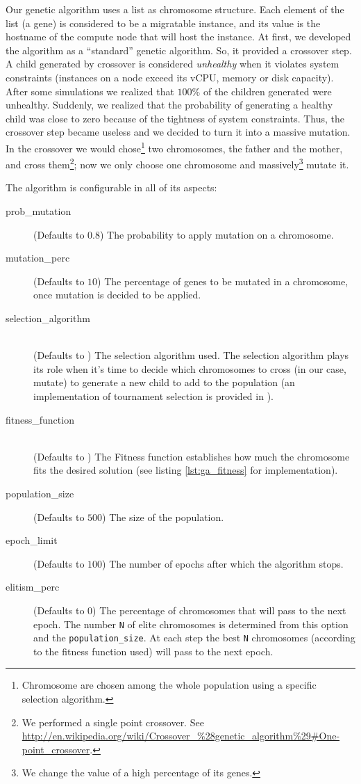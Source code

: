 Our genetic algorithm uses a list as chromosome structure. Each element of the list (a gene) is considered to be a migratable instance, and its value is the hostname of the compute node that will host the instance. At first, we developed the algorithm as a ``standard'' genetic algorithm. So, it provided a crossover step. A child generated by crossover is considered \emph{unhealthy} when it violates system constraints (instances on a node exceed its vCPU, memory or disk capacity). After some simulations we realized that $100\%$ of the children generated were unhealthy. Suddenly, we realized that the probability of generating a healthy child was close to zero because of the tightness of system constraints. Thus, the crossover step became useless and we decided to turn it into a massive mutation. In the crossover we would chose\footnote{Chromosome are chosen among the whole population using a specific selection algorithm.} two chromosomes, the father and the mother, and cross them\footnote{We performed a single point crossover. See \url{http://en.wikipedia.org/wiki/Crossover\_\%28genetic\_algorithm\%29\#One-point\_crossover}.}; now we only choose one chromosome and massively\footnote{We change the value of a high percentage of its genes.} mutate it.

The algorithm is configurable in all of its aspects:
\begin{description}
	\item[prob\_mutation] (Defaults to $0.8$) The probability to apply mutation on a chromosome.
	\item[mutation\_perc] (Defaults to $10$) The percentage of genes to be mutated in a chromosome, once mutation is decided to be applied.
	\item[selection\_algorithm] \hfill \\
	(Defaults to ) The selection algorithm used. The selection algorithm plays its role when it's time to decide which chromosomes to cross (in our case, mutate) to generate a new child to add to the population (an implementation of tournament selection is provided in ).
	\item[fitness\_function] \hfill \\
	(Defaults to ) The Fitness function establishes how much the chromosome fits the desired solution (see listing \ref{lst:ga_fitness} for  implementation).
	\item[population\_size] (Defaults to $500$) The size of the population.
	\item[epoch\_limit] (Defaults to $100$) The number of epochs after which the algorithm stops.
	\item[elitism\_perc] (Defaults to $0$) The percentage of chromosomes that will pass to the next epoch. The number \texttt{N} of elite chromosomes is determined from this option and the \texttt{population\_size}. At each step the best \texttt{N} chromosomes (according to the fitness function used) will pass to the next epoch.
\end{description}

